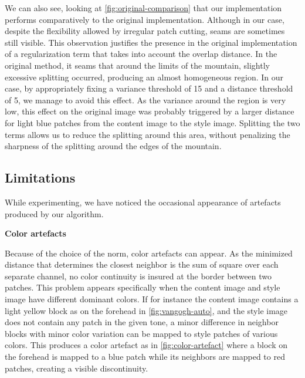 \documentclass[a4paper]{article}
\begin{document}
We can also see, looking at \ref{fig:original-comparison} that our implementation performs comparatively to the original implementation. Although in our case, despite the flexibility allowed by irregular patch cutting, seams are sometimes still visible. This observation justifies the presence in the original implementation of a regularization term that takes into account the overlap distance.
In the original method, it seams that around the limits of the mountain, slightly excessive splitting occurred, producing an almost homogeneous region. In our case, by appropriately fixing a variance threshold of 15 and a distance threshold of 5, we manage to avoid this effect. As the variance around the region is very low, this effect on the original image was probably triggered by a larger distance for light blue patches from the content image to the style image. Splitting the two terms allows us to reduce the splitting around this area, without penalizing the sharpness of the splitting around the edges of the mountain.  


\subsection{Limitations}

While experimenting, we have noticed the occasional appearance of artefacts produced by our algorithm.

\textbf{Color artefacts} %
\label{sub:color_artefacts}


Because of the choice of the norm, color artefacts can appear. As the minimized distance that determines the closest neighbor is the sum of square over each separate channel, no color continuity is insured at the border between two patches. This problem appears specifically when the content image and style image have different dominant colors. If for instance the content image contains a light yellow block as on the forehead in \ref{fig:vangogh-auto}, and the style image does not contain any patch in the given tone, a minor difference in neighbor blocks with minor color variation can be mapped to style patches of various colors. This produces a color artefact as in \ref{fig:color-artefact} where a block on the forehead is mapped to a blue patch while its neighbors are mapped to red patches, creating a visible discontinuity.
\end{document}
